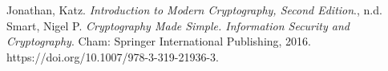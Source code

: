 \documentclass[11pt,openany]{article}
\begin{document}
%
%
%
%

\vfill
\begin{thebibliography}{9}\large
	Jonathan, Katz. \textit{Introduction to Modern Cryptography, Second Edition}., n.d.
	Smart, Nigel P. \textit{Cryptography Made Simple. Information Security and Cryptography}. Cham: Springer International Publishing, 2016. https://doi.org/10.1007/978-3-319-21936-3.
	
	
\end{thebibliography}

\newpage
\appendix
%
%
\end{document}
